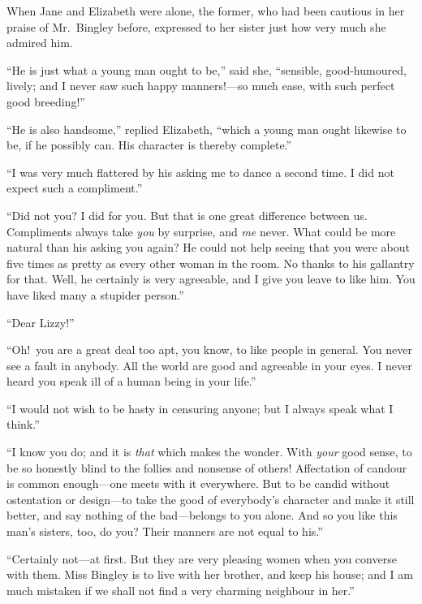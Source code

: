 \documentclass[12pt,english]{book}
\begin{document}

When Jane and Elizabeth were alone, the former, who had been cautious
in her praise of Mr.\ Bingley before, expressed to her sister just
how very much she admired him.

{}``He is just what a young man ought to be,'' said she, {}``sensible,
good-humoured, lively; and I never saw such happy manners!\mbox{---}so
much ease, with such perfect good breeding!''\ 

{}``He is also handsome,'' replied Elizabeth, {}``which a young
man ought likewise to be, if he possibly can. His character is thereby
complete.''

{}``I was very much flattered by his asking me to dance a second
time. I did not expect such a compliment.''

{}``Did not you? I did for you. But that is one great difference
between us. Compliments always take \textit{you} by surprise, and
\textit{me} never. What could be more natural than his asking you
again? He could not help seeing that you were about five times as
pretty as every other woman in the room. No thanks to his gallantry
for that. Well, he certainly is very agreeable, and I give you leave
to like him. You have liked many a stupider person.''

{}``Dear Lizzy!''\ 

{}``Oh!\ you are a great deal too apt, you know, to like people
in general. You never see a fault in anybody. All the world are good
and agreeable in your eyes. I never heard you speak ill of a human
being in your life.''

{}``I would not wish to be hasty in censuring anyone; but I always
speak what I think.''

{}``I know you do; and it is \textit{that} which makes the wonder.
With \textit{your} good sense, to be so honestly blind to the follies
and nonsense of others! Affectation of candour is common enough\mbox{---}one
meets with it everywhere. But to be candid without ostentation or
design\mbox{---}to take the good of everybody's character and make
it still better, and say nothing of the bad\mbox{---}belongs to you
alone. And so you like this man's sisters, too, do you? Their manners
are not equal to his.''

{}``Certainly not\mbox{---}at first. But they are very pleasing
women when you converse with them. Miss Bingley is to live with her
brother, and keep his house; and I am much mistaken if we shall not
find a very charming neighbour in her.''
\end{document}

